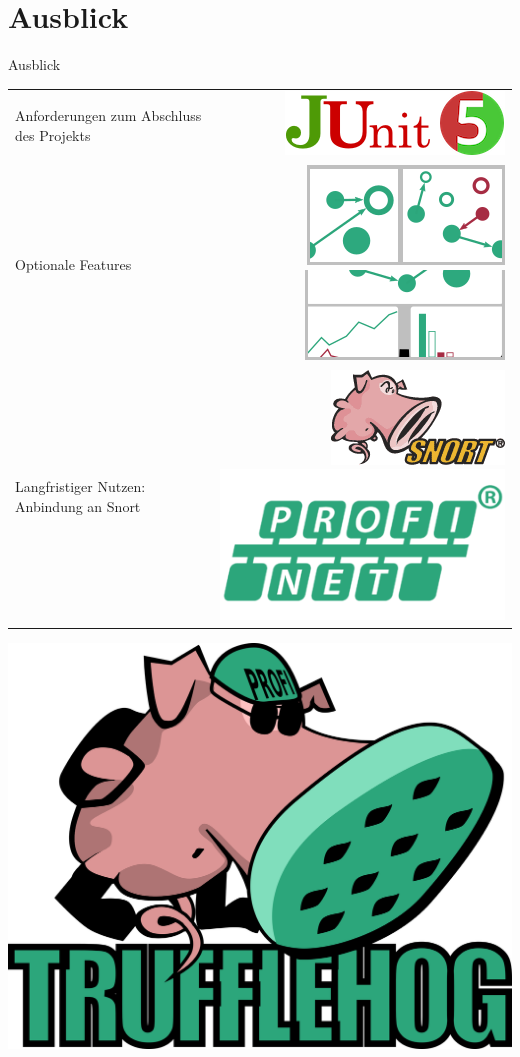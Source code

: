 \documentclass[18pt]{beamer}
\begin{document}
\section{Ausblick}
\begin{frame}{Ausblick}
	\begin{tabular}{m{5cm}r}
		Anforderungen zum Abschluss des Projekts \vspace{0.5cm} & \includegraphics[width=0.3\linewidth]{images/max-junit} \\
		\pause
		Optionale Features \vspace{0.5cm} & \includegraphics[width=0.2\linewidth]{images/max-tiling} \hspace{0.5cm} \includegraphics[width=0.2\linewidth]{images/max-stats} \\
		\pause
		Langfristiger Nutzen: \newline Anbindung an Snort \vspace{0.5cm} & \includegraphics[width=0.2\linewidth]{images/max-snort} \hspace{0.5cm} \includegraphics[width=0.2\linewidth]{images/max-profinet} \\
	\end{tabular}
\end{frame}

\begin{frame}
	\centering
	\includegraphics[width=0.8\linewidth]{images/title}
\end{frame}


\appendix
\beginbackup


\backupend
\end{document}
